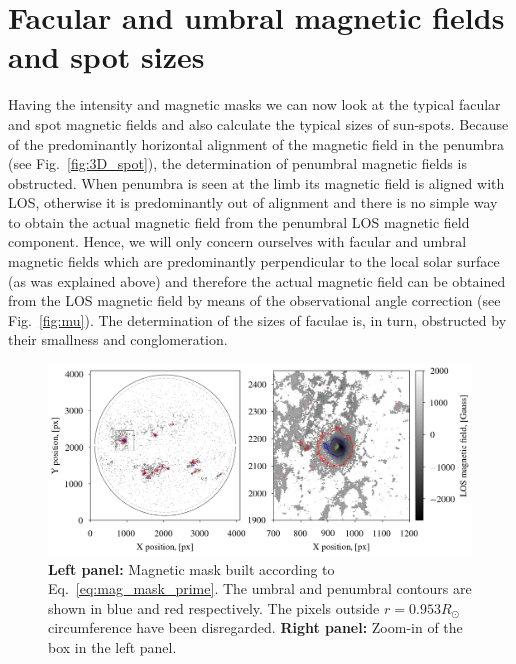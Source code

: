 \documentclass[paper=a4, fontsize=11pt]{article}
\numberwithin{equation}{section}
\numberwithin{figure}{section}
\numberwithin{table}{section}
\begin{document}
\section{Facular and umbral magnetic fields and spot sizes}
Having the intensity and magnetic masks we can now look at the typical facular and spot magnetic fields and also
calculate the typical sizes of sun-spots.
Because of the predominantly horizontal alignment of the magnetic field in the penumbra (see Fig.~\ref{fig:3D_spot}),
the determination of penumbral magnetic fields is obstructed.
When penumbra is seen at the limb its magnetic field is aligned with LOS,
otherwise it is predominantly out of alignment and there is no simple way to
obtain the actual magnetic field from the penumbral LOS magnetic field component.
Hence, we will only concern ourselves with facular and umbral magnetic fields which are predominantly perpendicular
to the local solar surface (as was explained above) and therefore the actual magnetic field can be obtained from the
LOS magnetic field by means of the observational angle correction (see Fig.~\ref{fig:mu}).
The determination of the sizes of faculae is, in turn, obstructed by their smallness and conglomeration.
\begin{figure}[h!]
\centering
\includegraphics[scale=0.685]{spt_cnts}
\caption[]{\textbf{Left panel:} Magnetic mask built according to Eq.~\eqref{eq:mag_mask_prime}.
           The umbral and penumbral contours are shown in blue and red respectively.
           The pixels outside $r = 0.953R_\odot$ circumference have been disregarded.
           \textbf{Right panel:} Zoom-in of the box in the left panel.}
\label{fig:spt_cnts}
\end{figure}
\end{document}
